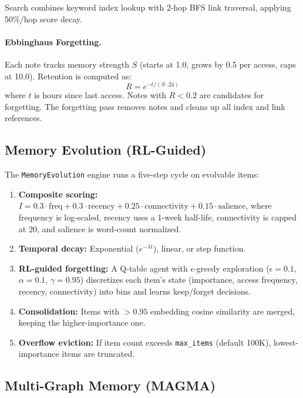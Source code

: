 \documentclass[11pt,twocolumn]{article}
\begin{document}
Search combines keyword index lookup with 2-hop BFS link traversal, applying 50\%/hop score decay.

\paragraph{Ebbinghaus Forgetting.} Each note tracks memory strength $S$ (starts at 1.0, grows by 0.5 per access, caps at 10.0). Retention is computed as:
\begin{equation}
R = e^{-t / (S \cdot 24)}
\end{equation}
where $t$ is hours since last access. Notes with $R < 0.2$ are candidates for forgetting. The forgetting pass removes notes and cleans up all index and link references.

\subsection{Memory Evolution (RL-Guided)}

The \texttt{MemoryEvolution} engine runs a five-step cycle on evolvable items:

\begin{enumerate}[nosep]
  \item \textbf{Composite scoring:} $I = 0.3 \cdot \text{freq} + 0.3 \cdot \text{recency} + 0.25 \cdot \text{connectivity} + 0.15 \cdot \text{salience}$, where frequency is log-scaled, recency uses a 1-week half-life, connectivity is capped at 20, and salience is word-count normalized.
  \item \textbf{Temporal decay:} Exponential ($e^{-\lambda t}$), linear, or step function.
  \item \textbf{RL-guided forgetting:} A Q-table agent with $\epsilon$-greedy exploration ($\epsilon=0.1$, $\alpha=0.1$, $\gamma=0.95$) discretizes each item's state (importance, access frequency, recency, connectivity) into bins and learns keep/forget decisions.
  \item \textbf{Consolidation:} Items with $>0.95$ embedding cosine similarity are merged, keeping the higher-importance one.
  \item \textbf{Overflow eviction:} If item count exceeds \texttt{max\_items} (default 100K), lowest-importance items are truncated.
\end{enumerate}

\subsection{Multi-Graph Memory (MAGMA)}
\end{document}
